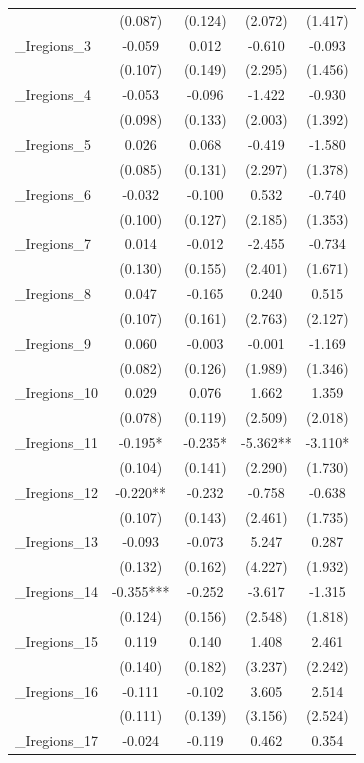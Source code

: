 \documentclass[]{article}
\begin{document}
\begin{tabular}{lcccc}
 & (0.087) & (0.124) & (2.072) & (1.417) \\
\_Iregions\_3 & -0.059 & 0.012 & -0.610 & -0.093 \\
 & (0.107) & (0.149) & (2.295) & (1.456) \\
\_Iregions\_4 & -0.053 & -0.096 & -1.422 & -0.930 \\
 & (0.098) & (0.133) & (2.003) & (1.392) \\
\_Iregions\_5 & 0.026 & 0.068 & -0.419 & -1.580 \\
 & (0.085) & (0.131) & (2.297) & (1.378) \\
\_Iregions\_6 & -0.032 & -0.100 & 0.532 & -0.740 \\
 & (0.100) & (0.127) & (2.185) & (1.353) \\
\_Iregions\_7 & 0.014 & -0.012 & -2.455 & -0.734 \\
 & (0.130) & (0.155) & (2.401) & (1.671) \\
\_Iregions\_8 & 0.047 & -0.165 & 0.240 & 0.515 \\
 & (0.107) & (0.161) & (2.763) & (2.127) \\
\_Iregions\_9 & 0.060 & -0.003 & -0.001 & -1.169 \\
 & (0.082) & (0.126) & (1.989) & (1.346) \\
\_Iregions\_10 & 0.029 & 0.076 & 1.662 & 1.359 \\
 & (0.078) & (0.119) & (2.509) & (2.018) \\
\_Iregions\_11 & -0.195* & -0.235* & -5.362** & -3.110* \\
 & (0.104) & (0.141) & (2.290) & (1.730) \\
\_Iregions\_12 & -0.220** & -0.232 & -0.758 & -0.638 \\
 & (0.107) & (0.143) & (2.461) & (1.735) \\
\_Iregions\_13 & -0.093 & -0.073 & 5.247 & 0.287 \\
 & (0.132) & (0.162) & (4.227) & (1.932) \\
\_Iregions\_14 & -0.355*** & -0.252 & -3.617 & -1.315 \\
 & (0.124) & (0.156) & (2.548) & (1.818) \\
\_Iregions\_15 & 0.119 & 0.140 & 1.408 & 2.461 \\
 & (0.140) & (0.182) & (3.237) & (2.242) \\
\_Iregions\_16 & -0.111 & -0.102 & 3.605 & 2.514 \\
 & (0.111) & (0.139) & (3.156) & (2.524) \\
\_Iregions\_17 & -0.024 & -0.119 & 0.462 & 0.354 \\

\end{tabular}
\end{document}
